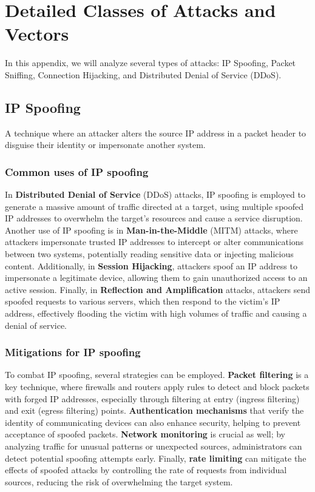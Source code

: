 \chapter{Detailed Classes of Attacks and Vectors}

In this appendix, we will analyze several types of attacks: IP Spoofing, Packet Sniffing, Connection Hijacking, and Distributed Denial of Service (DDoS).

\raggedright
\begin{center}
    \section{IP Spoofing} 
\end{center}
A technique where an attacker alters the source IP address in a packet header to disguise their identity or impersonate another system.

\subsection{Common uses of IP spoofing}
In \textbf{Distributed Denial of Service} (DDoS) attacks, IP spoofing is employed to generate a massive amount of traffic directed at a target, using multiple spoofed IP addresses to overwhelm the target’s resources and cause a service disruption. Another use of IP spoofing is in \textbf{Man-in-the-Middle} (MITM) attacks, where attackers impersonate trusted IP addresses to intercept or alter communications between two systems, potentially reading sensitive data or injecting malicious content. Additionally, in \textbf{Session Hijacking}, attackers spoof an IP address to impersonate a legitimate device, allowing them to gain unauthorized access to an active session. Finally, in \textbf{Reflection and Amplification} attacks, attackers send spoofed requests to various servers, which then respond to the victim’s IP address, effectively flooding the victim with high volumes of traffic and causing a denial of service. 

\subsection{Mitigations for IP spoofing}
To combat IP spoofing, several strategies can be employed. \textbf{Packet filtering} is a key technique, where firewalls and routers apply rules to detect and block packets with forged IP addresses, especially through filtering at entry (ingress filtering) and exit (egress filtering) points. \textbf{Authentication mechanisms} that verify the identity of communicating devices can also enhance security, helping to prevent acceptance of spoofed packets. \textbf{Network monitoring} is crucial as well; by analyzing traffic for unusual patterns or unexpected sources, administrators can detect potential spoofing attempts early. Finally, \textbf{rate limiting} can mitigate the effects of spoofed attacks by controlling the rate of requests from individual sources, reducing the risk of overwhelming the target system.

